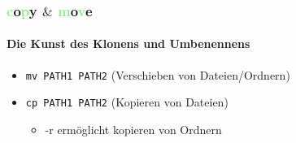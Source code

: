 \documentclass[12pt,utf8]{beamer}
\begin{document}


\begin{frame}
\frametitle{\textcolor{lightGreen}{c}o\textcolor{lightGreen}{p}y $\&$ \textcolor{lightGreen}{m}o\textcolor{lightGreen}{v}e}
\framesubtitle{Die Kunst des Klonens und Umbenennens}
\begin{itemize}
	\item \texttt{mv PATH1 PATH2} (Verschieben von Dateien/Ordnern)
	\item \texttt{cp PATH1 PATH2} (Kopieren von Dateien)
	\begin{itemize}
		\item -r ermöglicht kopieren von Ordnern
	\end{itemize}
\end{itemize}
\end{frame}
\end{document}
